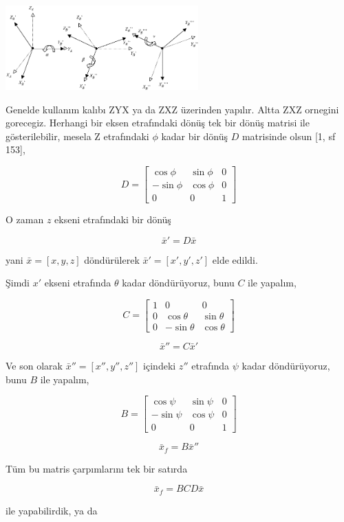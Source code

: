 \documentclass[12pt,fleqn]{article}\usepackage{../../common}
\begin{document}
\includegraphics[width=20em]{phy_072_rot_06.png}

Genelde kullanım kalıbı ZYX ya da ZXZ üzerinden yapılır. Altta ZXZ ornegini
gorecegiz. Herhangi bir eksen etrafındaki dönüş tek bir dönüş matrisi ile
gösterilebilir, mesela Z etrafındaki $\phi$ kadar bir dönüş $D$ matrisinde olsun
[1, sf 153],

$$
D = \left[\begin{array}{rrr}
\cos \phi & \sin\phi & 0 \\
-\sin \phi & \cos\phi & 0 \\
0 & 0 & 1
\end{array}\right]
$$

O zaman $z$ ekseni etrafındaki bir dönüş

$$
\bar{x}' = D \bar{x}
$$

yani $\bar{x} = [x, y, z]$ döndürülerek $\bar{x}' = [x', y', z']$ elde edildi.

Şimdi $x'$ ekseni etrafında $\theta$ kadar döndürüyoruz, bunu $C$ ile yapalım,

$$
C = \left[\begin{array}{rrr}
1 & 0 & 0 \\
0 & \cos\theta & \sin\theta \\
0 & -\sin\theta & \cos\theta
\end{array}\right]
$$

$$
\bar{x}'' = C \bar{x}'
$$

Ve son olarak $\bar{x}'' = [x'',y'',z'']$ içindeki $z''$ etrafında $\psi$ kadar
döndürüyoruz, bunu $B$ ile yapalım,

$$
B = \left[\begin{array}{rrr}
\cos \psi & \sin\psi & 0 \\
-\sin \psi & \cos\psi & 0 \\
0 & 0 & 1
\end{array}\right]
$$

$$
\bar{x}_f = B \bar{x}''
$$

Tüm bu matris çarpımlarını tek bir satırda

$$
\bar{x}_f =  B C D \bar{x}
$$

ile yapabilirdik, ya da
\end{document}
